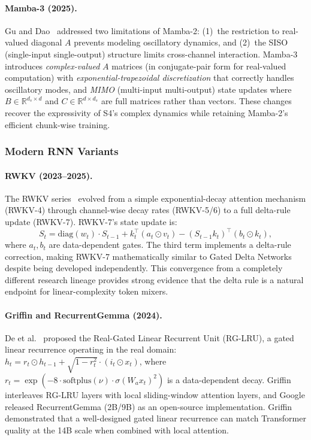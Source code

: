 \documentclass[11pt,a4paper]{article}
\begin{document}
\paragraph{Mamba-3 (2025).}
Gu and Dao~\cite{gu2025mamba3} addressed two limitations of Mamba-2: (1)~the restriction to real-valued diagonal $A$ prevents modeling oscillatory dynamics, and (2)~the SISO (single-input single-output) structure limits cross-channel interaction. Mamba-3 introduces \emph{complex-valued} $A$ matrices (in conjugate-pair form for real-valued computation) with \emph{exponential-trapezoidal discretization} that correctly handles oscillatory modes, and \emph{MIMO} (multi-input multi-output) state updates where $B \in \mathbb{R}^{d_s \times d}$ and $C \in \mathbb{R}^{d \times d_s}$ are full matrices rather than vectors. These changes recover the expressivity of S4's complex dynamics while retaining Mamba-2's efficient chunk-wise training.

\subsubsection{Modern RNN Variants}

\paragraph{RWKV (2023--2025).}
The RWKV series~\cite{peng2023rwkv, peng2024rwkv56, peng2025rwkv7} evolved from a simple exponential-decay attention mechanism (RWKV-4) through channel-wise decay rates (RWKV-5/6) to a full delta-rule update (RWKV-7). RWKV-7's state update is:
\begin{equation}
S_t = \text{diag}(w_t) \cdot S_{t-1} + k_t^\top (a_t \odot v_t) - (S_{t-1} k_t)^\top (b_t \odot k_t),
\end{equation}
where $a_t, b_t$ are data-dependent gates. The third term implements a delta-rule correction, making RWKV-7 mathematically similar to Gated Delta Networks despite being developed independently. This convergence from a completely different research lineage provides strong evidence that the delta rule is a natural endpoint for linear-complexity token mixers.

\paragraph{Griffin and RecurrentGemma (2024).}
De et al.~\cite{de2024griffin} proposed the Real-Gated Linear Recurrent Unit (RG-LRU), a gated linear recurrence operating in the real domain: $h_t = r_t \odot h_{t-1} + \sqrt{1 - r_t^2} \cdot (i_t \odot x_t)$, where $r_t = \exp(-8 \cdot \text{softplus}(\nu) \cdot \sigma(W_a x_t)^2)$ is a data-dependent decay. Griffin interleaves RG-LRU layers with local sliding-window attention layers, and Google released RecurrentGemma (2B/9B) as an open-source implementation. Griffin demonstrated that a well-designed gated linear recurrence can match Transformer quality at the 14B scale when combined with local attention.
\end{document}
